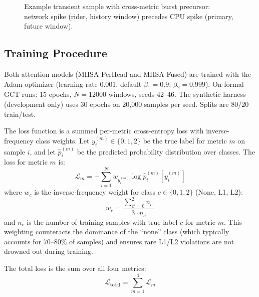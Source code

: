 \begin{figure}[htp]
\centering
{}
\caption{Example transient sample with cross-metric burst precursor: network spike (rider, history window) precedes CPU spike (primary, future window).}
\label{fig:transient_example}
\end{figure}

\subsection{Training Procedure}
\label{subsec:training}

Both attention models (MHSA-PerHead and MHSA-Fused) are trained with the Adam optimizer (learning rate 0.001, default $\beta_1 = 0.9$, $\beta_2 = 0.999$). On formal GCT runs: 15 epochs, $N{=}12000$ windows, seeds 42--46. The synthetic harness (development only) uses 30 epochs on 20,000 samples per seed. Splits are 80/20 train/test.

The loss function is a summed per-metric cross-entropy loss with inverse-frequency class weights. Let $y_i^{(m)} \in \{0, 1, 2\}$ be the true label for metric $m$ on sample $i$, and let $\hat{p}_i^{(m)}$ be the predicted probability distribution over classes. The loss for metric $m$ is:
\begin{equation}
\mathcal{L}_m = -\sum_{i=1}^{N} w_{y_i^{(m)}} \log \hat{p}_i^{(m)}[y_i^{(m)}]
\end{equation}
where $w_c$ is the inverse-frequency weight for class $c \in \{0, 1, 2\}$ (None, L1, L2):
\begin{equation}
w_c = \frac{\sum_{c'=0}^{2} n_{c'}}{3 \cdot n_c}
\end{equation}
and $n_c$ is the number of training samples with true label $c$ for metric $m$. This weighting counteracts the dominance of the ``none'' class (which typically accounts for 70--80\% of samples) and ensures rare L1/L2 violations are not drowned out during training.

The total loss is the sum over all four metrics:
\begin{equation}
\mathcal{L}_{\text{total}} = \sum_{m=1}^{4} \mathcal{L}_m
\end{equation}

